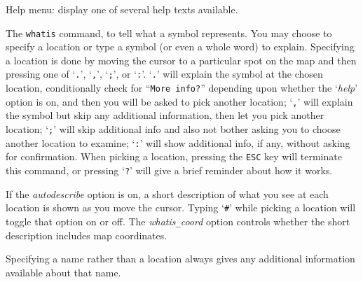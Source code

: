 \blist{}
\item[\tb{?}]
Help menu:  display one of several help texts available.
\item[\tb{/}]
The {\tt whatis} command, to
tell what a symbol represents.  You may choose to specify a location
or type a symbol (or even a whole word) to explain.
Specifying a location is done by moving the cursor to a particular spot
on the map and then pressing one of `{\tt .}', `{\tt ,}', `{\tt ;}',
or `{\tt :}'.  `{\tt .}' will explain the symbol at the chosen location,
conditionally check for ``{\tt More info?}'' depending upon whether the
`{\it help\/}'
option is on, and then you will be asked to pick another location;
`{\tt ,}' will explain the symbol but skip any additional
information, then let you pick another location;
`{\tt ;}' will skip additional info and also not bother asking
you to choose another location to examine; `{\tt :}' will show additional
info, if any, without asking for confirmation.  When picking a location,
pressing the {\tt ESC} key will terminate this command, or pressing `{\tt ?}'
will give a brief reminder about how it works.

If the
{\it autodescribe\/}
option is on, a short description of what you see at each location is
shown as you move the cursor.  Typing `{\tt \#}' while picking a location will
toggle that option on or off.
The
{\it whatis\verb+_+coord\/}
option controls whether the short description includes map coordinates.

Specifying a name rather than a location
always gives any additional information available about that name.


